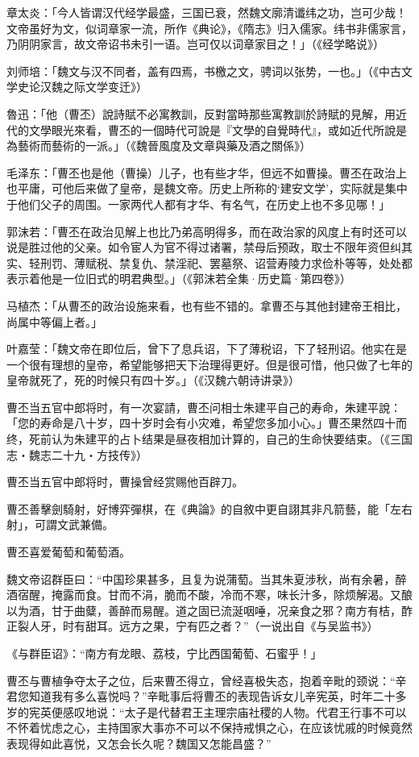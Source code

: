 章太炎：「今人皆谓汉代经学最盛，三国已衰，然魏文廓清谶纬之功，岂可少哉！文帝虽好为文，似词章家一流，所作《典论》，《隋志》归入儒家。纬书非儒家言，乃阴阴家言，故文帝诏书未引一语。岂可仅以词章家目之！」（《经学略说》）

刘师培：「魏文与汉不同者，盖有四焉，书檄之文，骋词以张势，一也。」（《中古文学史论汉魏之际文学变迁》）

魯迅：「他（曹丕）說詩賦不必寓教訓，反對當時那些寓教訓於詩賦的見解，用近代的文學眼光來看，曹丕的一個時代可說是『文學的自覺時代』，或如近代所說是為藝術而藝術的一派。」（《魏晉風度及文章與藥及酒之關係》）

毛泽东：「曹丕也是他（曹操）儿子，也有些才华，但远不如曹操。曹丕在政治上也平庸，可他后来做了皇帝，是魏文帝。历史上所称的‘建安文学’，实际就是集中于他们父子的周围。一家两代人都有才华、有名气，在历史上也不多见哪！」

郭沫若：「曹丕在政治见解上也比乃弟高明得多，而在政治家的风度上有时还可以说是胜过他的父亲。如令宦人为官不得过诸署，禁母后预政，取士不限年资但纠其实、轻刑罚、薄赋税、禁复仇、禁淫祀、罢墓祭、诏营寿陵力求俭朴等等，处处都表示着他是一位旧式的明君典型。」（《郭沫若全集·历史篇·第四卷》）

马植杰：「从曹丕的政治设施来看，也有些不错的。拿曹丕与其他封建帝王相比，尚属中等偏上者。」

叶嘉莹：「魏文帝在即位后，曾下了息兵诏，下了薄税诏，下了轻刑诏。他实在是一个很有理想的皇帝，希望能够把天下治理得更好。但是很可惜，他只做了七年的皇帝就死了，死的时候只有四十岁。」（《汉魏六朝诗讲录》）

曹丕当五官中郎将时，有一次宴請，曹丕问相士朱建平自己的寿命，朱建平說：「您的寿命是八十岁，四十岁时会有小灾难，希望您多加小心。」曹丕果然四十而终，死前认为朱建平的占卜结果是昼夜相加计算的，自己的生命快要结束。（《三国志‧魏志二十九‧方技传》）

曹丕当五官中郎将时，曹操曾经赏赐他百辟刀。

曹丕善擊劍騎射，好博弈彈棋，在《典論》的自敘中更自詡其非凡箭藝，能「左右射」，可謂文武兼備。

曹丕喜爱葡萄和葡萄酒。

魏文帝诏群臣曰：“中国珍果甚多，且复为说蒲萄。当其朱夏涉秋，尚有余暑，醉酒宿醒，掩露而食。甘而不涓，脆而不酸，冷而不寒，味长汁多，除烦解渴。又酿以为酒，甘于曲糵，善醉而易醒。道之固已流涎咽唾，况亲食之邪？南方有桔，酢正裂人牙，时有甜耳。远方之果，宁有匹之者？”（一说出自《与吴监书》）

《与群臣诏》：“南方有龙眼、荔枝，宁比西国葡萄、石蜜乎！」

曹丕与曹植争夺太子之位，后来曹丕得立，曾经喜极失态，抱着辛毗的颈说：“辛君您知道我有多么喜悦吗？”辛毗事后将曹丕的表现告诉女儿辛宪英，时年二十多岁的宪英便感叹地说：“太子是代替君王主理宗庙社稷的人物。代君王行事不可以不怀着忧虑之心，主持国家大事亦不可以不保持戒惧之心，在应该忧戚的时候竟然表现得如此喜悦，又怎会长久呢？魏国又怎能昌盛？”

